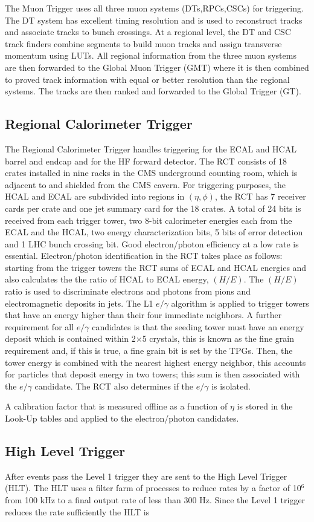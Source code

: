 The Muon Trigger uses all three muon systems (DTs,RPCs,CSCs) for triggering.
The DT system has excellent timing resolution and is used to reconstruct tracks
and associate tracks to bunch crossings. At a regional level, the DT and CSC track finders
combine segments to build muon tracks and assign transverse momentum using
LUTs. All regional information from the three muon systems are then forwarded
to the Global Muon Trigger (GMT) where it is then combined to proved track
information with equal or better resolution than the regional systems. The tracks
are then ranked and forwarded to the Global Trigger (GT).
  \subsection{Regional Calorimeter Trigger}
The Regional Calorimeter Trigger handles triggering for the %
ECAL and HCAL barrel and 
endcap and for the HF forward detector.
The RCT consists of 18 crates installed in nine racks
in the CMS underground counting room, which is 
adjacent to and shielded from the CMS cavern.
For triggering purposes, the HCAL and ECAL are subdivided into regions in 
$(\eta,\phi)$, the RCT has 7 receiver cards per crate and one jet summary card
for the 18 crates. A total of 24 bits is received from each trigger tower, 
two 8-bit calorimeter energies each from the ECAL and the HCAL,
two energy characterization bits, 5 bits of error detection and 1 LHC bunch crossing bit.
Good electron/photon efficiency at a low rate is essential. Electron/photon
identification in the RCT takes place as follows: starting from the trigger towers
the RCT sums of ECAL and HCAL energies and also calculates the
the ratio of HCAL to ECAL energy, $(H/E)$. The $(H/E)$ ratio is used to
discriminate electrons and photons from pions and electromagnetic deposits
in jets. 
The L1 $e/\gamma$ algorithm is applied to trigger towers that have an energy
higher than their four immediate neighbors.
A further requirement for all $e/\gamma$ candidates
is that the seeding tower must have an energy deposit which is contained within 
2$\times$5 crystals, this is known as the fine grain requirement and, if this is true,
a fine grain bit is set by the TPGs. 
Then, the tower energy is combined with the nearest highest energy neighbor,
this accounts for particles that deposit energy in two towers; this sum is then
associated with the $e/\gamma$ candidate.
The RCT also determines if the $e/\gamma$ 
is isolated. 

A calibration factor that is measured offline as a function of 
$\eta$ is stored in the Look-Up tables and applied to the electron/photon candidates.


  \subsection{High Level Trigger}
After events pass the Level 1 trigger they are sent to the High Level Trigger (HLT). The
HLT uses a filter farm of processes to reduce rates by a factor of 10$^{6}$ from 
100 kHz to a final output rate of less than 300 Hz. Since the Level 1 trigger reduces
the rate sufficiently the HLT is 